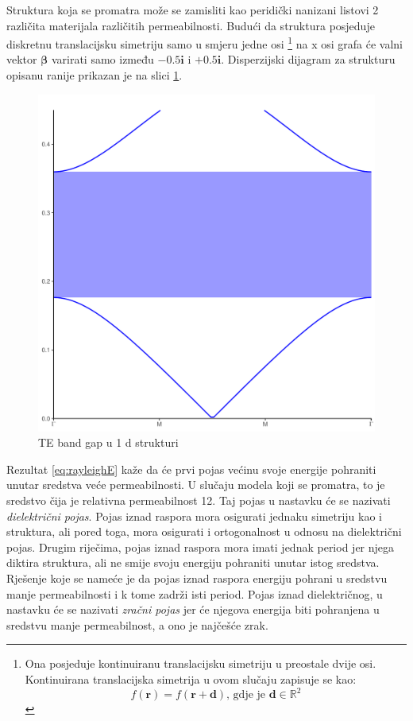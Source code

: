 \documentclass[utf8, seminar]{fer}
\begin{document}
Struktura koja se promatra može se zamisliti kao peridički nanizani listovi 2
različita materijala različitih permeabilnosti. Budući da struktura posjeduje
diskretnu translacijsku simetriju samo u smjeru jedne osi
\footnote{
	Ona posjeduje kontinuiranu translacijsku simetriju u preostale dvije osi.
	Kontinuirana translacijska simetrija u ovom slučaju zapisuje se kao:
	$$f(\mathbf{r}) = f(\mathbf{r} + \mathbf{d})
	\text{, gdje je }{\mathbf{d} \in \mathbb{R}^2}$$
}
na x osi grafa će valni vektor ${\bm{\beta}}$ varirati samo između
$-0.5\mathbf{i}$ i $+0.5\mathbf{i}$. Disperzijski dijagram za strukturu opisanu
ranije prikazan je na slici \ref{fig:1d_band_diagram}.
\begin{figure}[ht]
	\centering
	\includegraphics[width = 1.0\linewidth]{./images/1d_crystal_gap.pdf}
	\caption{TE band gap u 1 d strukturi}
	\label{fig:1d_band_diagram}
\end{figure}

Rezultat \ref{eq:rayleighE} kaže da će prvi pojas većinu svoje energije
pohraniti unutar sredstva veće permeabilnosti. U slučaju modela koji se
promatra, to je sredstvo čija je relativna permeabilnost 12. Taj pojas
u nastavku će se nazivati \emph{dielektrični pojas}. Pojas iznad raspora mora
osigurati jednaku simetriju kao i struktura, ali pored toga, mora osigurati i
ortogonalnost u odnosu na dielektrični pojas. Drugim riječima, pojas iznad
raspora mora imati jednak period jer njega diktira struktura, ali ne smije svoju
energiju pohraniti unutar istog sredstva. Rješenje koje se nameće je da pojas
iznad raspora energiju pohrani u sredstvu manje permeabilnosti i k tome zadrži
isti period. Pojas iznad dielektričnog, u nastavku će se nazivati \emph{zračni
pojas} jer će njegova energija biti pohranjena u sredstvu manje permeabilnost,
a ono je najčešće zrak.
\end{document}
